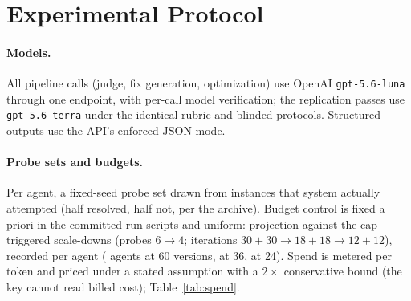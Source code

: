 \documentclass[11pt]{article}
\begin{document}
\section{Experimental Protocol}
\label{sec:protocol}
\paragraph{Models.}
All pipeline calls (judge, fix generation, optimization) use OpenAI
\texttt{gpt-5.6-luna} through one endpoint, with per-call model verification;
the replication passes use \texttt{gpt-5.6-terra} under the identical rubric
and blinded protocols. Structured outputs use the API's enforced-JSON mode.

\paragraph{Probe sets and budgets.}
Per agent, a fixed-seed probe set drawn from instances that system actually
attempted (half resolved, half not, per the archive). Budget control is
fixed a priori in the committed run scripts and uniform: projection against the cap triggered scale-downs
(probes $6\to4$; iterations $30{+}30\to18{+}18\to12{+}12$), recorded per
agent (\swItersFull{} agents at 60 versions, \swItersMid{} at 36,
\swItersLow{} at 24). Spend is metered per token and priced under a stated
assumption with a $2\times$ conservative bound (the key cannot read billed
cost); Table~\ref{tab:spend}.

\begin{table}[t]\centering
\caption{Spend and scale-down record, all passes included (optimization run,
blinded passes, repairs, replication, trajectory and noise passes). Subtotals and
the grand total are computed from the unrounded ledger; per-row values are
rounded to the cent independently and may not sum to the displayed subtotal
exactly (the combined LLM subtotal is \swLLMCombined{} from the unrounded
ledger).}
\label{tab:spend}\footnotesize

\end{table}

\begin{table}[t]\centering
\caption{Cost-efficiency of the delivered work (accounting rate \$1.25/\$10 per
Mtok --- a conservative rate; the accounting-rate LLM subtotal is $\approx$\swAcctMult$\times$ the all-Luna list-price bound (verified list
price of \$0.20/\$1.20; list-price figures shown where they differ).}
\label{tab:costs}\footnotesize

\end{table}
\end{document}
